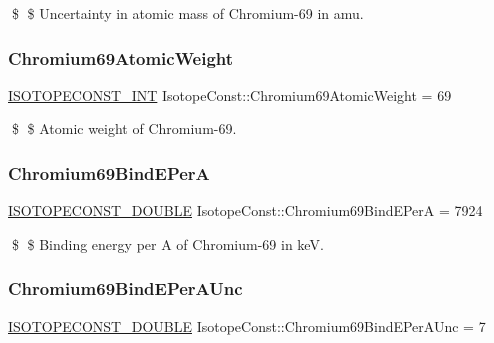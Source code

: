 \$ \$ Uncertainty in atomic mass of Chromium-\/69 in amu. \mbox{\label{group___isotope_const-_chromium-_cr69_ga2a1ca80418b5cfddf949465be388fc8b}} 
\subsubsection{\texorpdfstring{Chromium69\+Atomic\+Weight}{Chromium69AtomicWeight}}
{\footnotesize\ttfamily \mbox{\hyperlink{group___isotope_const-_macros_ga5f18360b3e99483a35c32d789e62621c}{I\+S\+O\+T\+O\+P\+E\+C\+O\+N\+S\+T\+\_\+\+I\+NT}} Isotope\+Const\+::\+Chromium69\+Atomic\+Weight = 69}

\$ \$ Atomic weight of Chromium-\/69. \mbox{\label{group___isotope_const-_chromium-_cr69_ga1a571ffca49242b0e59b2392f07d742a}} 
\subsubsection{\texorpdfstring{Chromium69\+Bind\+E\+PerA}{Chromium69BindEPerA}}
{\footnotesize\ttfamily \mbox{\hyperlink{group___isotope_const-_macros_ga8f45a7272ce02c0b4c65c44636ed719a}{I\+S\+O\+T\+O\+P\+E\+C\+O\+N\+S\+T\+\_\+\+D\+O\+U\+B\+LE}} Isotope\+Const\+::\+Chromium69\+Bind\+E\+PerA = 7924}

\$ \$ Binding energy per A of Chromium-\/69 in keV. \mbox{\label{group___isotope_const-_chromium-_cr69_gabe36d9d0bf1840393eba6204e2d975ff}} 
\subsubsection{\texorpdfstring{Chromium69\+Bind\+E\+Per\+A\+Unc}{Chromium69BindEPerAUnc}}
{\footnotesize\ttfamily \mbox{\hyperlink{group___isotope_const-_macros_ga8f45a7272ce02c0b4c65c44636ed719a}{I\+S\+O\+T\+O\+P\+E\+C\+O\+N\+S\+T\+\_\+\+D\+O\+U\+B\+LE}} Isotope\+Const\+::\+Chromium69\+Bind\+E\+Per\+A\+Unc = 7}

